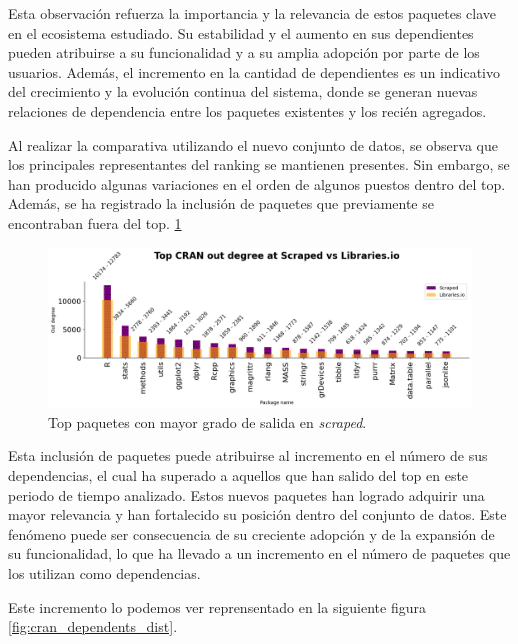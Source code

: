 Esta observación refuerza la importancia y la relevancia de estos paquetes clave en el
ecosistema estudiado. Su estabilidad y el aumento en sus dependientes pueden atribuirse a
su funcionalidad y a su amplia adopción por parte de los usuarios. Además, el incremento en
la cantidad de dependientes es un indicativo del crecimiento y la evolución continua del
sistema, donde se generan nuevas relaciones de dependencia entre los paquetes existentes
y los recién agregados.

Al realizar la comparativa utilizando el nuevo conjunto de datos, se observa que los principales
representantes del ranking se mantienen presentes. Sin embargo, se han producido algunas variaciones
en el orden de algunos puestos dentro del top. Además, se ha registrado la inclusión de paquetes que
previamente se encontraban fuera del top. \ref{fig:cran_out_scraped_top}

\begin{figure}[h!]
    \begin{center}
        \includegraphics[width=1\textwidth]{img/cran/out_scr.png}
        \caption{Top paquetes con mayor grado de salida en \textit{scraped}.}
        \label{fig:cran_out_scraped_top}
    \end{center}
\end{figure}

Esta inclusión de paquetes puede atribuirse al incremento en el número de sus dependencias,
el cual ha superado a aquellos que han salido del top en este periodo de tiempo analizado.
Estos nuevos paquetes han logrado adquirir una mayor relevancia y han fortalecido su posición
dentro del conjunto de datos. Este fenómeno puede ser consecuencia de su creciente adopción y
de la expansión de su funcionalidad, lo que ha llevado a un incremento en el número de paquetes
que los utilizan como dependencias.

Este incremento lo podemos ver reprensentado en la siguiente figura \ref{fig:cran_dependents_dist}.

